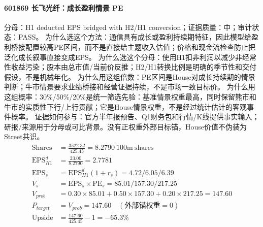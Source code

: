\paragraph{601869 长飞光纤：成长盈利情景 PE}
分母：H1 deducted EPS bridged with H2/H1 conversion；证据质量：中；审计状态：PASS。
为什么选这个方法：通信具有成长或盈利持续期特征，因此模型给盈利桥接配置较高PE区间，而不是直接给主题收入估值；价格和现金流检查防止把泛化成长叙事直接变成EPS。
为什么选这个分母：使用H1扣非利润以减少非经常性收益污染；股本由总市值/当前价反推；H2/H1转换比例是明确的季节性和交付假设，不是机械年化。
为什么用这组倍数：PE区间是House对成长持续期的情景判断；牛市情景要求业绩桥接和经营证据持续，不是市场一致目标价。
为什么用这组概率：30\%/50\%/20\%是统一筛选先验：基准情景权重最高，同时保留熊市和牛市的实质性下行/上行贡献；它是House情景权重，不是经过统计估计的客观事件概率。
证据如何参与：官方半年报预告、Q1财务包和行情/K线提供事实输入；研报/来源用于分母或可比背景。没有正权重外部目标锚，House价值不伪装为Street共识。
\begin{align*}
\mathrm{Shares} &= \frac{3522.32}{425.45}=8.2790\ \mathrm{100m\ shares}\\
\mathrm{EPS}_{H1}^d &= \frac{23.00}{8.2790}=2.7781\\
\mathrm{EPS}_s &= \mathrm{EPS}_{H1}^d(1+r_s)=4.72/6.05/6.39\\
V_s &= \mathrm{EPS}_s\times \mathrm{PE}_s=85.01/157.30/217.25\\
V_{prob} &= 0.30\times 85.01+0.50\times 157.30+0.20\times 217.25=147.60\\
P_{target} &= V_{prob}=147.60\quad(\text{外部锚权重}=0)\\
\mathrm{Upside} &= \frac{147.60}{425.45}-1=-65.3\%\\
\end{align*}


